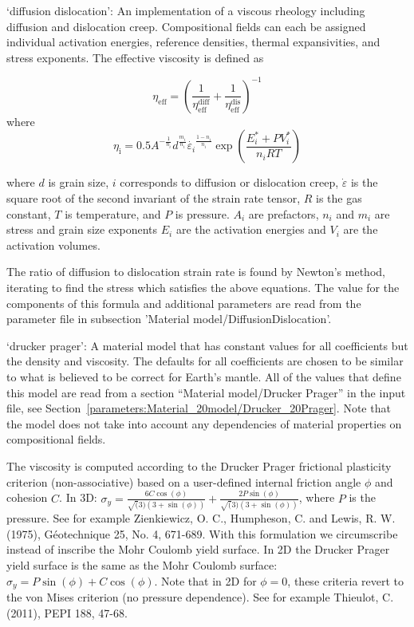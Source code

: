 \begin{itemize}
`diffusion dislocation':  An implementation of a viscous rheology including diffusion and dislocation creep. Compositional fields can each be assigned individual activation energies, reference densities, thermal expansivities, and stress exponents. The effective viscosity is defined as 

 \[\eta_\text{eff} = \left(\frac{1}{\eta_\text{eff}^\text{diff}}+ \frac{1}{\eta_\text{eff}^\text{dis}}\right)^{-1}\] where \[\eta_\text{i} = 0.5 A^{-\frac{1}{n_i}} d^\frac{m_i}{n_i} \dot{\varepsilon_i}^{\frac{1-n_i}{n_i}} \exp\left(\frac{E_i^* + PV_i^*}{n_iRT}\right)\] 

 where $d$ is grain size, $i$ corresponds to diffusion or dislocation creep, $\dot{\varepsilon}$ is the square root of the second invariant of the strain rate tensor, $R$ is the gas constant, $T$ is temperature,  and $P$ is pressure. $A_i$ are prefactors, $n_i$ and $m_i$ are stress and grain size exponents $E_i$ are the activation energies and $V_i$ are the activation volumes. 

 The ratio of diffusion to dislocation strain rate is found by Newton's method, iterating to find the stress which satisfies the above equations. The value for the components of this formula and additional parameters are read from the parameter file in subsection 'Material model/DiffusionDislocation'.

`drucker prager': A material model that has constant values for all coefficients but the density and viscosity. The defaults for all coefficients are chosen to be similar to what is believed to be correct for Earth's mantle. All of the values that define this model are read from a section ``Material model/Drucker Prager'' in the input file, see Section~\ref{parameters:Material_20model/Drucker_20Prager}. Note that the model does not take into account any dependencies of material properties on compositional fields. 

The viscosity is computed according to the Drucker Prager frictional plasticity criterion (non-associative) based on a user-defined internal friction angle $\phi$ and cohesion $C$. In 3D:  $\sigma_y = \frac{6 C \cos(\phi)}{\sqrt(3) (3+\sin(\phi))} + \frac{2 P \sin(\phi)}{\sqrt(3) (3+\sin(\phi))}$, where $P$ is the pressure. See for example Zienkiewicz, O. C., Humpheson, C. and Lewis, R. W. (1975), G\'{e}otechnique 25, No. 4, 671-689. With this formulation we circumscribe instead of inscribe the Mohr Coulomb yield surface. In 2D the Drucker Prager yield surface is the same as the Mohr Coulomb surface:  $\sigma_y = P \sin(\phi) + C \cos(\phi)$. Note that in 2D for $\phi=0$, these criteria revert to the von Mises criterion (no pressure dependence). See for example Thieulot, C. (2011), PEPI 188, 47-68. 


\end{itemize}
